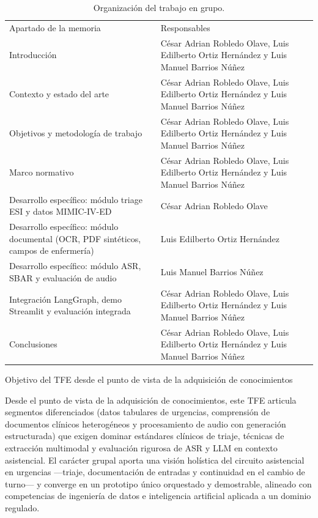\begin{table}[H]
  \centering
  \caption{Organización del trabajo en grupo.}
  \label{tab:group-work}
  \begingroup
  \begin{tabularx}{\linewidth}{|>{\raggedright\arraybackslash}X|>{\raggedright\arraybackslash}X|}
  \hline
  \rowcolor{unirTableHeader}
  \multicolumn{2}{|>{\raggedright\arraybackslash}X|}{\textcolor{white}{\textbf{Organización del trabajo en grupo - Desarrollo de la memoria}}} \\
  \hline
  \rowcolor{unirTableBand}
  Apartado de la memoria & Responsables \\
  \hline
  Introducción & César Adrian Robledo Olave, Luis Edilberto Ortiz Hernández y Luis Manuel Barrios Núñez \\
  \hline
  \rowcolor{unirTableBand}
  Contexto y estado del arte & César Adrian Robledo Olave, Luis Edilberto Ortiz Hernández y Luis Manuel Barrios Núñez \\
  \hline
  Objetivos y metodología de trabajo & César Adrian Robledo Olave, Luis Edilberto Ortiz Hernández y Luis Manuel Barrios Núñez \\
  \hline
  \rowcolor{unirTableBand}
  Marco normativo & César Adrian Robledo Olave, Luis Edilberto Ortiz Hernández y Luis Manuel Barrios Núñez \\
  \hline
  Desarrollo específico: módulo triage ESI y datos MIMIC-IV-ED & César Adrian Robledo Olave \\
  \hline
  \rowcolor{unirTableBand}
  Desarrollo específico: módulo documental (OCR, PDF sintéticos, campos de enfermería) & Luis Edilberto Ortiz Hernández \\
  \hline
  Desarrollo específico: módulo ASR, SBAR y evaluación de audio & Luis Manuel Barrios Núñez \\
  \hline
  \rowcolor{unirTableBand}
  Integración LangGraph, demo Streamlit y evaluación integrada & César Adrian Robledo Olave, Luis Edilberto Ortiz Hernández y Luis Manuel Barrios Núñez \\
  \hline
  Conclusiones & César Adrian Robledo Olave, Luis Edilberto Ortiz Hernández y Luis Manuel Barrios Núñez \\
  \hline
  \end{tabularx}
  \endgroup
\end{table}

Objetivo del TFE desde el punto de vista de la adquisición de conocimientos

Desde el punto de vista de la adquisición de conocimientos, este TFE articula segmentos diferenciados (datos tabulares de urgencias, comprensión de documentos clínicos heterogéneos y procesamiento de audio con generación estructurada) que exigen dominar estándares clínicos de triaje, técnicas de extracción multimodal y evaluación rigurosa de ASR y LLM en contexto asistencial. El carácter grupal aporta una visión holística del circuito asistencial en urgencias ---triaje, documentación de entradas y continuidad en el cambio de turno--- y converge en un prototipo único orquestado y demostrable, alineado con competencias de ingeniería de datos e inteligencia artificial aplicada a un dominio regulado.

